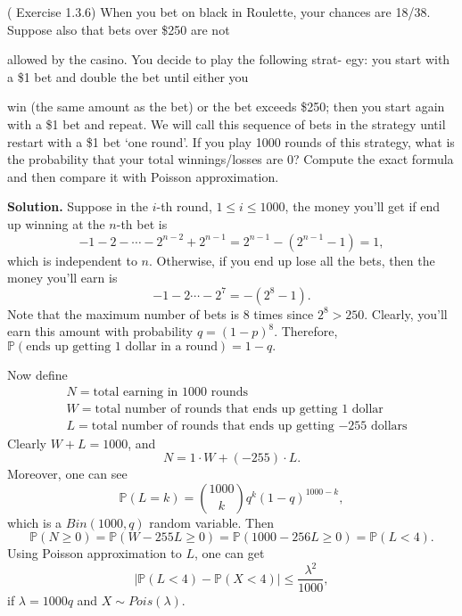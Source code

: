 \begin{eg}[HW5,Q4]
(\cite{IntroPanchenko} Exercise 1.3.6)
When you bet on black in Roulette, your
chances are 18/38. Suppose also that bets over \$250 are not

allowed by the casino. You decide to play the following strat-
egy: you start with a \$1 bet and double the bet until either you

win (the same amount as the bet) or the bet exceeds \$250;
then you start again with a \$1 bet and repeat. We will call
this sequence of bets in the strategy until restart with a \$1
bet ‘one round’. If you play 1000 rounds of this strategy,
what is the probability that your total winnings/losses are
0? Compute the exact formula and then compare it with
Poisson approximation. 
\end{eg}
\textbf{Solution. } Suppose in the $i$-th round, $1\leq i\leq 1000$, the money you'll get if end up winning at the $n$-th bet is
\begin{equation*}
-1-2-\cdots-2^{n-2}+2^{n-1}=2^{n-1}-(2^{n-1}-1)=1,
\end{equation*}
which is independent to $n$. Otherwise, if you end up lose all the bets, then the money you'll earn is
\begin{equation*}
-1-2\cdots-2^7=-(2^8-1).
\end{equation*}
Note that the maximum number of bets is $8$ times since $2^8>250$. Clearly, you'll earn this amount with probability $q=(1-p)^8$. Therefore, $\mathbb{P}(\text{ends up getting $1$ dollar in a round})=1-q.$

Now define
\begin{equation*}
\begin{aligned}
&N=\text{total earning in $1000$ rounds} \\& 
W =\text{total number of rounds that ends up getting $1$ dollar} \\&
L =\text{total number of rounds that ends up getting $-255$ dollars}
\end{aligned}
\end{equation*}
Clearly $W+L=1000$, and
\begin{equation*}
N = 1\cdot W+(-255)\cdot L.
\end{equation*}
Moreover, one can see
\begin{equation*}
\mathbb{P}(L=k)=\binom{1000}{k}q^k(1-q)^{1000-k},
\end{equation*}
which is a $Bin(1000,q)$ random variable. Then
\begin{equation*}
\mathbb{P}(N\geq 0)=\mathbb{P}(W-255L\geq 0)=\mathbb{P}(1000-256L\geq 0)=\mathbb{P}(L<4).
\end{equation*}
Using Poisson approximation to $L$, one can get
\begin{equation*}
\big|\mathbb{P}(L<4)-\mathbb{P}(X<4)\big|\leq\frac{\lambda^2}{1000},
\end{equation*}
if $\lambda = 1000q$ and $X\sim Pois(\lambda)$.

